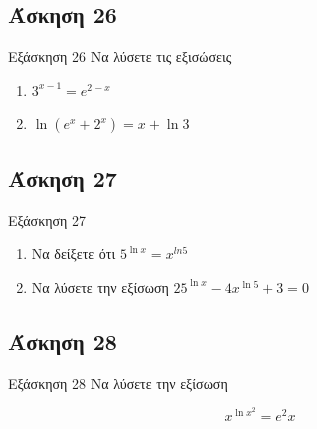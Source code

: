 \documentclass[greek]{beamer}
\begin{document}
\subsection{Άσκηση 26}
\begin{frame}[label=Άσκηση26,t]{Εξάσκηση 26}
 Να λύσετε τις εξισώσεις
 \begin{enumerate}
  \item<1-> $3^{x-1}=e^{2-x}$
  \item<2-> $\ln (e^x+2^x)=x+\ln 3$
 \end{enumerate}

\end{frame}

\subsection{Άσκηση 27}
\begin{frame}[label=Άσκηση27,t]{Εξάσκηση 27}
 \begin{enumerate}
  \item<1-> Να δείξετε ότι $5^{\ln x}=x^{ln 5}$
  \item<2-> Να λύσετε την εξίσωση $25^{\ln x}-4x^{\ln 5}+3=0$
 \end{enumerate}

\end{frame}

\subsection{Άσκηση 28}
\begin{frame}[label=Άσκηση28,t]{Εξάσκηση 28}
 Να λύσετε την εξίσωση

 $$x^{\ln x^2}=e^2x$$

\end{frame}
\end{document}

